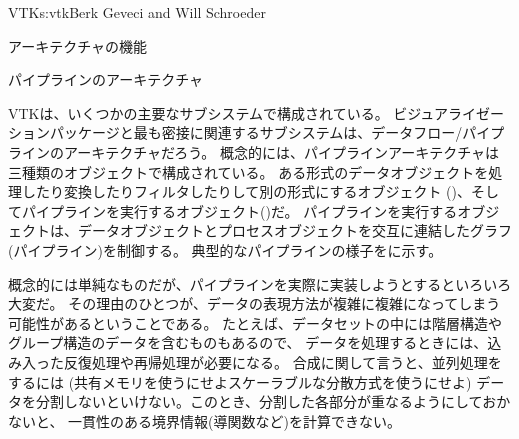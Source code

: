 \begin{aosachapter}{VTK}{s:vtk}{Berk Geveci and Will Schroeder}
\begin{aosasect1}{アーキテクチャの機能}
\begin{aosasect2}{パイプラインのアーキテクチャ}

VTKは、いくつかの主要なサブシステムで構成されている。
ビジュアライゼーションパッケージと最も密接に関連するサブシステムは、データフロー/パイプラインのアーキテクチャだろう。
概念的には、パイプラインアーキテクチャは三種類のオブジェクトで構成されている。
ある形式のデータオブジェクトを処理したり変換したりフィルタしたりして別の形式にするオブジェクト
()、そしてパイプラインを実行するオブジェクト()だ。
パイプラインを実行するオブジェクトは、データオブジェクトとプロセスオブジェクトを交互に連結したグラフ(パイプライン)を制御する。
典型的なパイプラインの様子をに示す。


概念的には単純なものだが、パイプラインを実際に実装しようとするといろいろ大変だ。
その理由のひとつが、データの表現方法が複雑に複雑になってしまう可能性があるということである。
たとえば、データセットの中には階層構造やグループ構造のデータを含むものもあるので、
データを処理するときには、込み入った反復処理や再帰処理が必要になる。
合成に関して言うと、並列処理をするには
(共有メモリを使うにせよスケーラブルな分散方式を使うにせよ)
データを分割しないといけない。このとき、分割した各部分が重なるようにしておかないと、
一貫性のある境界情報(導関数など)を計算できない。


\end{aosasect2}
\end{aosasect1}
\end{aosachapter}
